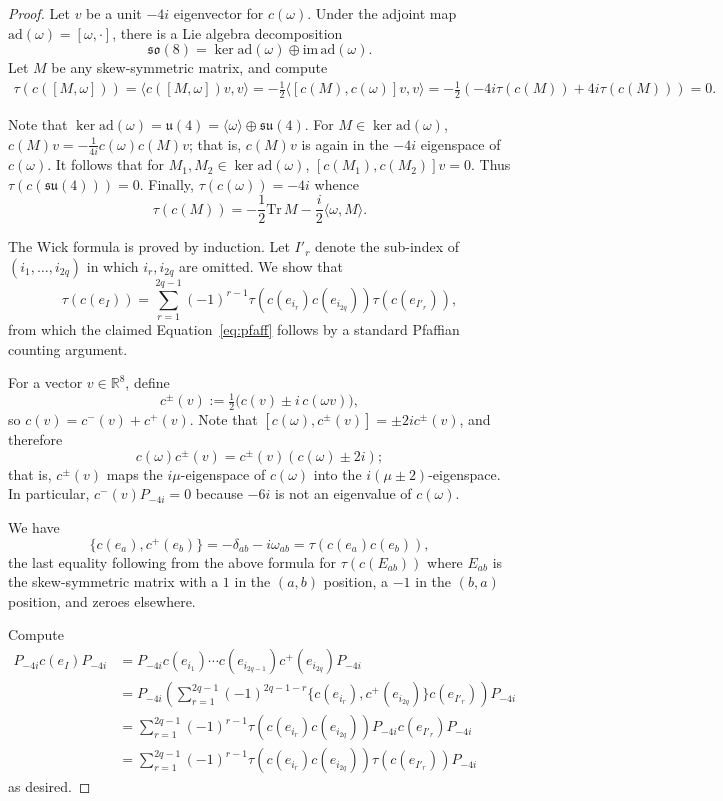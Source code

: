 \documentclass{article}
\newcommand{\real}{\mathbb{R}}
\newcommand{\so}{\mathfrak{so}}
\newcommand{\ad}{\mathrm{ad}}
\theoremstyle{definition}
\theoremstyle{remark}
\begin{document}
\begin{proof}
    Let $v$ be a unit $-4i$ eigenvector for $c(\omega)$.
    Under the adjoint map $\ad(\omega) = [\omega, \cdot]$, there is a Lie algebra decomposition
    \[
        \so(8) = \ker \ad(\omega) \oplus \mathrm{im}\, \ad(\omega).
    \]
    Let $M$ be any skew-symmetric matrix, and compute
    \begin{align*}
        \tau(c([M, \omega])) = \langle c([M, \omega])v, v \rangle = -\frac{1}{2} \langle [c(M), c(\omega)]v, v \rangle = -\frac{1}{2} (-4i \tau(c(M)) + 4i \tau(c(M))) = 0. 
    \end{align*}

    Note that $\ker \ad(\omega) = \mathfrak{u}(4) = \langle \omega \rangle \oplus \mathfrak{su}(4)$.
    For $M \in \ker \ad(\omega)$, $c(M)v = -\frac{1}{4i} c(\omega) c(M) v$; that is, $c(M) v$ is again in the $-4i$ eigenspace of $c(\omega)$.
    It follows that for $M_1, M_2 \in \ker \ad(\omega)$, $[c(M_1), c(M_2)]v = 0$.
    Thus $\tau(c(\mathfrak{su}(4))) = 0$.
    Finally, $\tau(c(\omega)) = -4i$ whence
    \[
    \tau(c(M)) = -\frac{1}{2} \mathrm{Tr}\, M -\frac{i}{2} \langle \omega, M \rangle.
    \]

    The Wick formula is proved by induction.
    Let $I'_r$ denote the sub-index of $(i_1, \ldots, i_{2q})$ in which $i_r, i_{2q}$ are omitted.
    We show that
    \[
        \tau(c(e_I)) = \sum_{r=1}^{2q-1} (-1)^{r-1} \tau(c(e_{i_r}) c(e_{i_{2q}})) \tau(c(e_{I'_r})),
    \]
    from which the claimed Equation~\eqref{eq:pfaff} follows by a standard Pfaffian counting argument.

      For a vector $v \in \real^8$, define
    \[
        c^\pm(v) := \tfrac{1}{2}\big(c(v) \pm i\, c(\omega v)\big), 
    \]
    so $c(v) = c^-(v) + c^+(v)$.
    Note that $[c(\omega), c^\pm(v)] = \pm 2i c^\pm(v)$, and therefore
    \[
        c(\omega) c^\pm(v) = c^\pm(v) ( c(\omega) \pm 2i );
    \]
    that is, $c^\pm(v)$ maps the $i\mu$-eigenspace of $c(\omega)$ into the $i(\mu \pm 2)$-eigenspace.
    In particular, $c^-(v) P_{-4i} = 0$ because $-6i$ is not an eigenvalue of $c(\omega)$.

    We have
    \[
        \{ c(e_a), c^+(e_b) \} = -\delta_{ab} - i \omega_{ab} = \tau(c(e_a) c(e_b)),
    \]
    the last equality following from the above formula for $\tau(c(E_{ab}))$ where $E_{ab}$ is the skew-symmetric matrix with a $1$ in the $(a,b)$ position, a $-1$ in the $(b,a)$ position, and zeroes elsewhere.

    Compute
    \begin{align*}
        P_{-4i} c(e_I) P_{-4i} &= P_{-4i} c(e_{i_1}) \cdots c(e_{i_{2q-1}}) c^+(e_{i_{2q}}) P_{-4i} \\
                               &= P_{-4i} \left(\sum_{r=1}^{2q-1} (-1)^{2q-1-r} \{c(e_{i_r}), c^+(e_{i_{2q}}) \} c(e_{I'_r})\right) P_{-4i} \\
                               &= \sum_{r=1}^{2q-1} (-1)^{r-1} \tau(c(e_{i_r})c(e_{i_{2q}}))P_{-4i} c(e_{I'_r}) P_{-4i} \\
                               &= \sum_{r=1}^{2q-1} (-1)^{r-1} \tau(c(e_{i_r})c(e_{i_{2q}}))\tau(c(e_{I'_r})) P_{-4i}
    \end{align*}
    as desired.
\end{proof}
\end{document}
